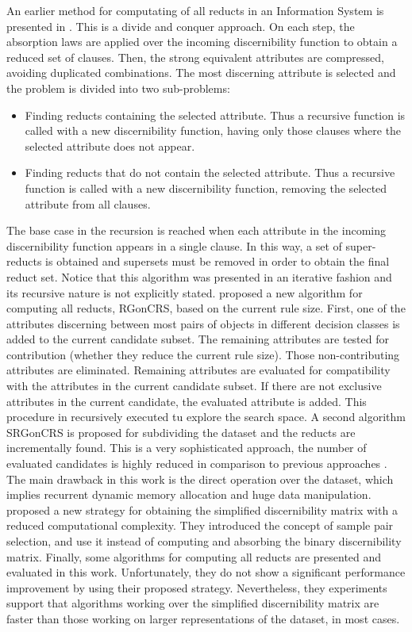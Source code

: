 \documentclass[authoryear,preprint,review,12pt]{elsarticle}
\begin{document}
  An earlier method for computating of all reducts in an Information System is presented in
  \citep{Starzyk99,Starzyk00}.
  This is a divide and conquer approach. On each step, the absorption laws are applied over the incoming
  discernibility function to obtain a reduced set of clauses. Then, the strong equivalent attributes are 
  compressed, avoiding duplicated combinations. The most discerning attribute is selected and the problem 
  is divided into two sub-problems: 
  \begin{itemize}
  \item Finding reducts containing the selected attribute. Thus a recursive function is called with a new 
  discernibility function, having only those clauses where the selected attribute does not appear.
  \item Finding reducts that do not contain the selected attribute. Thus a recursive function is called with 
  a new discernibility function, removing the selected attribute from all clauses.
  \end{itemize}
  The base case in the recursion is reached when each attribute in the incoming discernibility function appears 
  in a single clause. In this way, a set of super-reducts is obtained and supersets must be removed in order 
  to obtain the final reduct set. Notice that this algorithm was presented in an iterative fashion and its 
  recursive nature is not explicitly stated.  
  \cite{WangP07} proposed a new algorithm for computing all reducts, RGonCRS, based on the current rule size. 
  First, one of the attributes discerning between most pairs of objects in different decision classes is added 
  to the current candidate subset. 
  The remaining attributes are tested for contribution (whether they reduce the current rule
  size). Those non-contributing attributes are eliminated. Remaining attributes are evaluated for compatibility 
  with the attributes in the current candidate subset. If there are not exclusive attributes in the current
  candidate, the evaluated attribute is added. This procedure in recursively executed tu explore the search
  space. A second algorithm SRGonCRS is proposed for subdividing the dataset and the reducts are incrementally
  found. This is a very sophisticated approach, the number of evaluated candidates is highly reduced in comparison
  to previous approaches \citep{Bazan2001,Ohrn00}. The main drawback in this work is the direct operation over
  the dataset, which implies recurrent dynamic memory allocation and huge data manipulation.
  \cite{Chen2012} proposed a new strategy for obtaining the simplified discernibility matrix with a reduced
  computational complexity. They introduced the concept of sample pair selection, and use it instead of computing 
  and absorbing the binary discernibility matrix. Finally, some algorithms for computing all reducts are presented
  and evaluated in this work. Unfortunately, they do not show a significant performance improvement by using their
  proposed strategy. Nevertheless, they experiments support that algorithms working over the simplified 
  discernibility matrix are faster than those working on larger representations of the dataset, in most cases.
  
\end{document}
